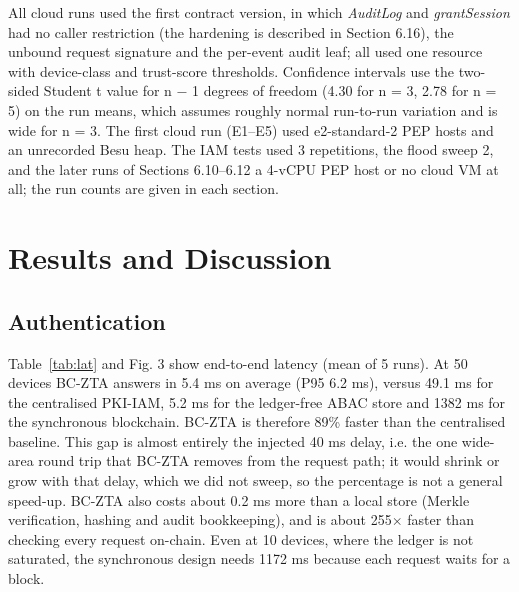 \documentclass[a4paper,5p,times,twocolumn,number,sort&compress]{elsarticle}
\begin{document}
All cloud runs used the first contract version, in which \emph{AuditLog} and \emph{grantSession} had no caller restriction (the hardening is described in Section 6.16), the unbound request signature and the per-event audit leaf; all used one resource with device-class and trust-score thresholds. Confidence intervals use the two-sided Student t value for n $-$ 1 degrees of freedom (4.30 for n = 3, 2.78 for n = 5) on the run means, which assumes roughly normal run-to-run variation and is wide for n = 3. The first cloud run (E1--E5) used e2-standard-2 PEP hosts and an unrecorded Besu heap. The IAM tests used 3 repetitions, the flood sweep 2, and the later runs of Sections 6.10--6.12 a 4-vCPU PEP host or no cloud VM at all; the run counts are given in each section.

\section{Results and Discussion}

\subsection{Authentication}

Table~\ref{tab:lat} and Fig. 3 show end-to-end latency (mean of 5 runs). At 50 devices BC-ZTA answers in 5.4 ms on average (P95 6.2 ms), versus 49.1 ms for the centralised PKI-IAM, 5.2 ms for the ledger-free ABAC store and 1382 ms for the synchronous blockchain. BC-ZTA is therefore 89\% faster than the centralised baseline. This gap is almost entirely the injected 40 ms delay, i.e. the one wide-area round trip that BC-ZTA removes from the request path; it would shrink or grow with that delay, which we did not sweep, so the percentage is not a general speed-up. BC-ZTA also costs about 0.2 ms more than a local store (Merkle verification, hashing and audit bookkeeping), and is about 255$\times$ faster than checking every request on-chain. Even at 10 devices, where the ledger is not saturated, the synchronous design needs 1172 ms because each request waits for a block.
\end{document}

